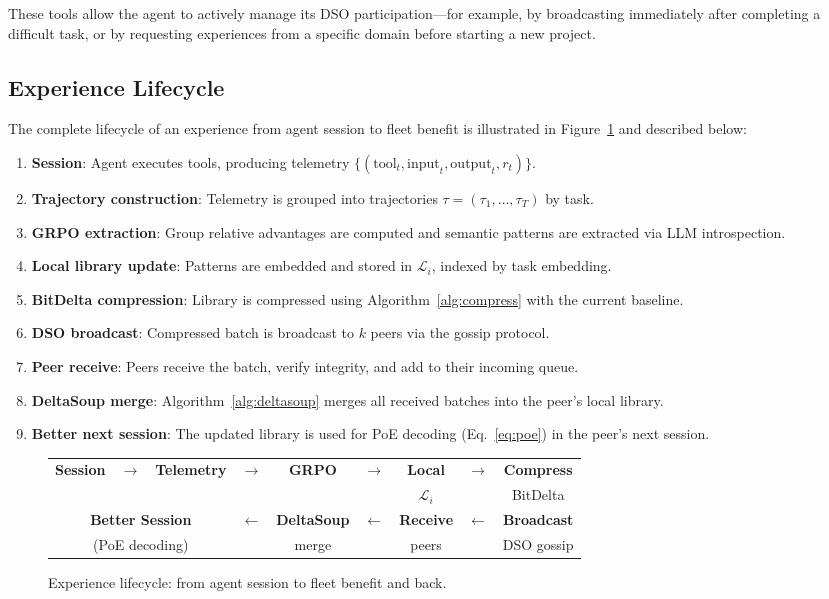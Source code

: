 These tools allow the agent to actively manage its DSO participation---for
example, by broadcasting immediately after completing a difficult task, or
by requesting experiences from a specific domain before starting a new
project.

\subsection{Experience Lifecycle}

The complete lifecycle of an experience from agent session to fleet benefit
is illustrated in Figure~\ref{fig:lifecycle} and described below:

\begin{enumerate}[leftmargin=1.5em]
    \item \textbf{Session}: Agent executes tools, producing telemetry
          $\{(\text{tool}_t, \text{input}_t, \text{output}_t, r_t)\}$.
    \item \textbf{Trajectory construction}: Telemetry is grouped into
          trajectories $\tau = (\tau_1, \ldots, \tau_T)$ by task.
    \item \textbf{GRPO extraction}: Group relative advantages are computed
          and semantic patterns are extracted via LLM introspection.
    \item \textbf{Local library update}: Patterns are embedded and stored
          in $\mathcal{L}_i$, indexed by task embedding.
    \item \textbf{BitDelta compression}: Library is compressed using
          Algorithm~\ref{alg:compress} with the current baseline.
    \item \textbf{DSO broadcast}: Compressed batch is broadcast to $k$
          peers via the gossip protocol.
    \item \textbf{Peer receive}: Peers receive the batch, verify integrity,
          and add to their incoming queue.
    \item \textbf{DeltaSoup merge}: Algorithm~\ref{alg:deltasoup} merges
          all received batches into the peer's local library.
    \item \textbf{Better next session}: The updated library is used for
          PoE decoding (Eq.~\ref{eq:poe}) in the peer's next session.
\end{enumerate}

\begin{figure}[H]
\centering
\small
\setlength{\tabcolsep}{4pt}
\begin{tabular}{ccccccccc}
\textbf{Session} & $\to$ & \textbf{Telemetry} & $\to$ & \textbf{GRPO} & $\to$ & \textbf{Local} & $\to$ & \textbf{Compress} \\
& & & & & & $\mathcal{L}_i$ & & BitDelta \\[4pt]
\multicolumn{3}{c}{\textbf{Better Session}} & $\leftarrow$ & \textbf{DeltaSoup} & $\leftarrow$ & \textbf{Receive} & $\leftarrow$ & \textbf{Broadcast} \\
\multicolumn{3}{c}{(PoE decoding)} & & merge & & peers & & DSO gossip \\
\end{tabular}
\caption{Experience lifecycle: from agent session to fleet benefit and back.}
\label{fig:lifecycle}
\end{figure}

